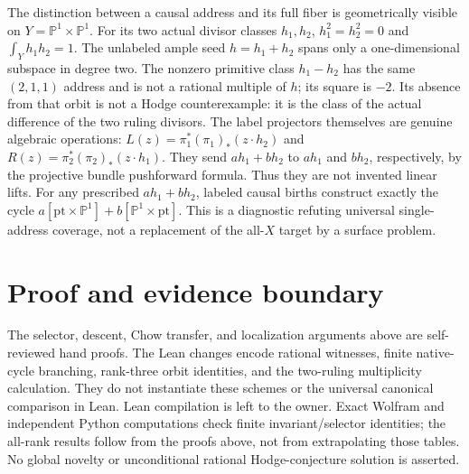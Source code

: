 \documentclass[11pt]{article}
\begin{document}
The distinction between a causal address and its full fiber is geometrically
visible on $Y=\mathbb P^1\times\mathbb P^1$. For its two actual divisor
classes $h_1,h_2$, $h_1^2=h_2^2=0$ and $\int_Yh_1h_2=1$.
The unlabeled ample seed $h=h_1+h_2$ spans only a one-dimensional subspace
in degree two. The nonzero primitive class $h_1-h_2$ has the same
$(2,1,1)$ address and is not a rational multiple of $h$; its square is $-2$.
Its absence from that orbit is not a Hodge counterexample: it is the
class of the actual difference of the two ruling divisors.
The label projectors themselves are genuine algebraic operations:
$L(z)=\pi_1^*(\pi_1)_*(z\cdot h_2)$ and
$R(z)=\pi_2^*(\pi_2)_*(z\cdot h_1)$. They send
$a h_1+b h_2$ to $a h_1$ and $b h_2$, respectively, by the projective
bundle pushforward formula. Thus they are not invented linear lifts.
For any prescribed $a h_1+b h_2$, labeled causal births construct exactly
the cycle $a[\mathrm{pt}\times\mathbb P^1]+b[\mathbb P^1\times\mathrm{pt}]$.
This is a diagnostic refuting universal single-address coverage, not a
replacement of the all-$X$ target by a surface problem.

\section{Proof and evidence boundary}
The selector, descent, Chow transfer, and localization arguments above
are self-reviewed hand proofs. The Lean changes encode rational witnesses,
finite native-cycle branching, rank-three orbit identities, and the
two-ruling multiplicity calculation. They do not instantiate these schemes
or the universal canonical comparison in Lean. Lean compilation is left
to the owner. Exact Wolfram and independent Python computations check
finite invariant/selector identities; the all-rank results follow from the
proofs above, not from extrapolating those tables. No global novelty or
unconditional rational Hodge-conjecture solution is asserted.
\end{document}
